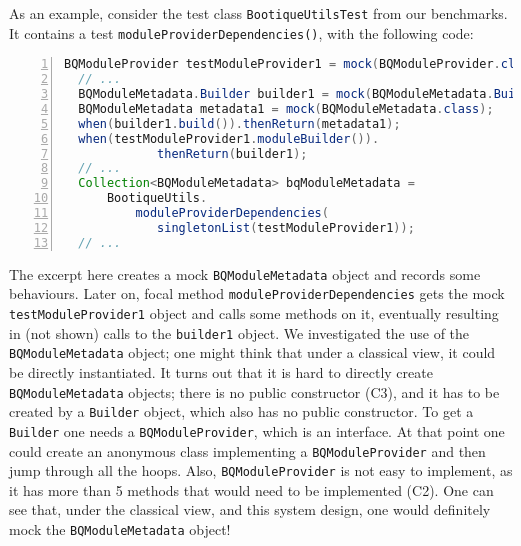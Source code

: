 As an example, consider the test class \texttt{BootiqueUtilsTest} from our benchmarks. It contains a test \texttt{moduleProviderDependencies()}, with the following code:

        \begin{lstlisting}[basicstyle=\ttfamily,
        numbers=left,numbersep=0pt,basicstyle=\scriptsize\ttfamily,language = Java, framesep=4.5mm, framexleftmargin=1.0mm, captionpos=b, escapechar=|, morekeywords={@Test}]
  BQModuleProvider testModuleProvider1 = mock(BQModuleProvider.class);
  // ...
  BQModuleMetadata.Builder builder1 = mock(BQModuleMetadata.Builder.class);
  BQModuleMetadata metadata1 = mock(BQModuleMetadata.class);
  when(builder1.build()).thenReturn(metadata1);
  when(testModuleProvider1.moduleBuilder()).
             thenReturn(builder1);
  // ...
  Collection<BQModuleMetadata> bqModuleMetadata =
      BootiqueUtils.
          moduleProviderDependencies(
             singletonList(testModuleProvider1));
  // ...
      \end{lstlisting}

The excerpt here creates a mock \texttt{BQModuleMetadata} object and records some behaviours.
Later on, focal method \texttt{moduleProviderDependencies} gets the mock \texttt{testModuleProvider1}
object and calls some methods on it, eventually resulting in (not shown) calls to the
\texttt{builder1} object. We investigated the use of the \texttt{BQModuleMetadata} object;
one might think that under a classical view, it could be directly instantiated. It turns out that
it is hard to directly create \texttt{BQModuleMetadata} objects; there is no public constructor (C3), and
it has to be created by a \texttt{Builder} object, which also has no public constructor. 
To get a \texttt{Builder} one needs a \texttt{BQModuleProvider},
which is an interface. At that point one could create an anonymous class implementing a \texttt{BQModuleProvider}
and then jump through all the hoops. Also, \texttt{BQModuleProvider} is not easy to implement, as it has more than 5 methods
that would need to be implemented (C2). One can see that, under the classical view, and this system design, one would definitely
mock the \texttt{BQModuleMetadata} object!


